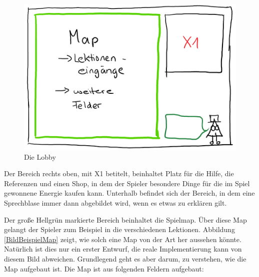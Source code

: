 \begin{figure}[ht]
\centering
\includegraphics[scale=1.1]{bilder/Lobby.PNG}
\caption{Die Lobby}
\label{BildLobby}
\end{figure}

Der Bereich rechts oben, mit X1 betitelt, beinhaltet Platz für die Hilfe, die Referenzen und einen Shop, in dem der Spieler besondere Dinge für die im Spiel gewonnene Energie kaufen kann. Unterhalb befindet sich der Bereich, in dem eine Sprechblase immer dann abgebildet wird, wenn es etwas zu erklären gilt.

Der große Hellgrün markierte Bereich beinhaltet die Spielmap. Über diese Map gelangt der Spieler zum Beispiel in die verschiedenen Lektionen. Abbildung \ref{BildBeispielMap} zeigt, wie solch eine Map von der Art her aussehen könnte. Natürlich ist dies nur ein erster Entwurf, die reale Implementierung kann von diesem Bild abweichen. Grundlegend geht es aber darum, zu verstehen, wie die Map aufgebaut ist. Die Map ist aus folgenden Feldern aufgebaut:

